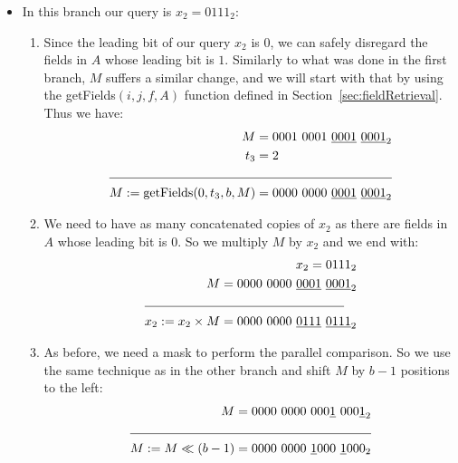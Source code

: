 \begin{itemize}
\begin{enumerate}
    \end{enumerate}
    \item
    In this branch our query is $x_2 = 0111_2$:
    \begin{enumerate}
        \item
        Since the leading bit of our query $x_2$ is $0$, we can safely disregard the fields in $A$ whose leading bit is $1$. Similarly to what was done in the first branch, $M$ suffers a similar change, and we will start with that by using the getFields$(i, j, f, A)$ function defined in Section~\ref{sec:fieldRetrieval}. Thus we have:
        \begin{align*}
            M &= 0001\ 0001\ \underline{0001}\ \underline{0001}_2 \\
            t_3 &= 2 \\
            \cline{1-2}
            M := \text{getFields}(0, t_3, b, M) &= 0000\ 0000\ \underline{0001}\ \underline{0001}_2 \\
        \end{align*}
        
        \item
        We need to have as many concatenated copies of $x_2$ as there are fields in $A$ whose leading bit is $0$. So we multiply $M$ by $x_2$ and we end with:
        \begin{align*}
            x_2 = 0111_2 \\
            M = 0000\ 0000\ \underline{0001}\ \underline{0001}_2 \\
            \cline{1-2}
            x_2 := x_2 \times M = 0000\ 0000\ \underline{0111}\ \underline{0111}_2 \\
        \end{align*}
        
        \item
        As before, we need a mask to perform the parallel comparison. So we use the same technique as in the other branch and shift $M$ by $b-1$ positions to the left:
        \begin{align*}
            M = 0000\ 0000\ 000\underline{1}\ 000\underline{1}_2& \\
            \cline{1-2}
            M := M \ll (b - 1) = 0000\ 0000\ \underline{1}000\ \underline{1}000_2& \\
        \end{align*}
        

\end{enumerate}
\end{itemize}
